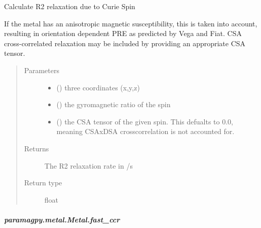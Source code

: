 \documentclass[a4paper,10pt,english]{sphinxmanual}
\begin{document}
\begin{fulllineitems}
\begin{fulllineitems}
\begin{fulllineitems}
\label{\detokenize{reference/generated/paramagpy.metal.Metal.dsa_r2:paramagpy.metal.Metal.dsa_r2}}
Calculate R2 relaxation due to Curie Spin

If the metal has an anisotropic magnetic susceptibility, this is
taken into account, resulting in orientation dependent PRE as
predicted by Vega and Fiat. CSA cross-correlated relaxation may
be included by providing an appropriate CSA tensor.
\begin{quote}\begin{description}
\item[{Parameters}] \leavevmode\begin{itemize}
\item {} 
 () \textendash{} three coordinates (x,y,z)

\item {} 
 () \textendash{} the gyromagnetic ratio of the spin

\item {} 
 (\sphinxstyleliteralemphasis{\sphinxupquote{ (}}\sphinxstyleliteralemphasis{\sphinxupquote{)}}) \textendash{} the CSA tensor of the given spin.
This defualts to 0.0, meaning CSAxDSA crosscorrelation is
not accounted for.

\end{itemize}

\item[{Returns}] \leavevmode
{} \textendash{} The R2 relaxation rate in /s

\item[{Return type}] \leavevmode
float

\end{description}\end{quote}

\end{fulllineitems}



\subparagraph{paramagpy.metal.Metal.fast\_ccr}
\label{\detokenize{reference/generated/paramagpy.metal.Metal.fast_ccr:paramagpy-metal-metal-fast-ccr}}\label{\detokenize{reference/generated/paramagpy.metal.Metal.fast_ccr::doc}}


\end{fulllineitems}
\end{fulllineitems}
\end{document}
